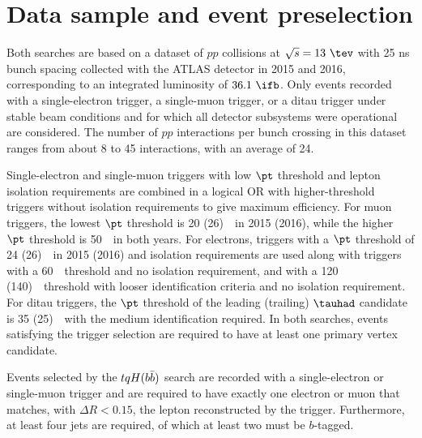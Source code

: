 \section{Data sample and event preselection}
\label{sec:data_presel}

Both searches are based on a dataset of $pp$ collisions at $\sqrt{s}=13~\tev$ with 25 ns bunch spacing collected 
with the ATLAS detector in 2015 and 2016, corresponding to an integrated luminosity of $36.1~\ifb$.
Only events recorded with a single-electron trigger, a single-muon trigger, or a ditau trigger under stable beam conditions 
and for which all detector subsystems were operational are considered.
The number of $pp$ interactions per bunch crossing in this dataset ranges from about 8 to 45 interactions, with an average of 24.

Single-electron and single-muon triggers with low $\pt$ threshold and lepton isolation requirements are combined in a logical OR 
with higher-threshold triggers without isolation requirements to give maximum efficiency. 
For muon triggers, the lowest $\pt$ threshold is 20 (26)~\gev\ in 2015 (2016), while the higher $\pt$ threshold is 50~\gev\ in both years. 
For electrons, triggers with a $\pt$ threshold of 24 (26)~\gev\ in 2015 (2016) and isolation requirements are used
along with triggers with a 60~\gev\ threshold and no isolation requirement, and with a 120 (140)~\gev\ threshold 
with looser identification criteria and no isolation requirement.
For ditau triggers, the $\pt$ threshold of the leading (trailing) $\tauhad$ candidate is 35 (25)~\gev\ with the medium identification required.
In both searches, events satisfying the trigger selection are required to have at least one primary vertex candidate.

Events selected by the $tqH(b\bar{b})$ search are recorded with a single-electron or single-muon trigger and 
are required to have exactly one electron or muon that matches, with $\Delta R < 0.15$, the lepton reconstructed by the trigger.  
Furthermore, at least four jets are required, of which at least two must be $b$-tagged.


